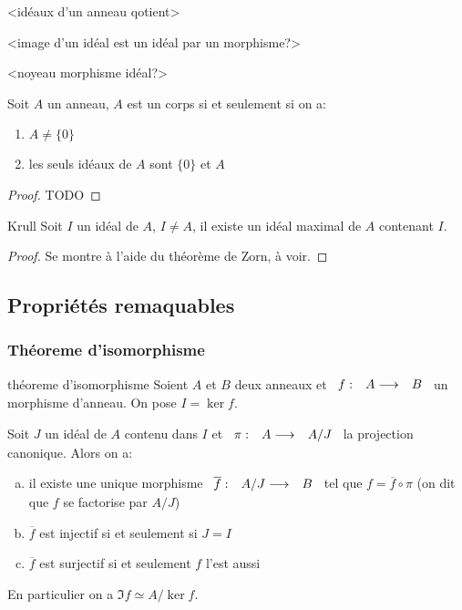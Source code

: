 <idéaux d'un anneau qotient>

<image d'un idéal est un idéal par un morphisme?>

<noyeau morphisme idéal?>

\begin{lemma}{}{}
    Soit $A$ un anneau, $A$ est un corps si et seulement si on a:
    \begin{enumerate}[(1)]
        \item $A \neq \{0\}$
        \item les seuls idéaux de $A$ sont $\{0\}$ et $A$
    \end{enumerate}
\end{lemma}

\begin{proof}
    TODO
\end{proof}

\begin{theorem}{Krull}{}
    Soit $I$ un idéal de $A$, $I \neq A$, il existe un idéal maximal de $A$ contenant $I$.
\end{theorem}

\begin{proof}
    Se montre à l'aide du théorème de Zorn, à voir.
\end{proof}

\subsection{Propriétés remaquables}

\subsubsection{Théoreme d'isomorphisme}

\begin{theorem}{théoreme d'isomorphisme}{}
    Soient $A$ et $B$ deux anneaux et $\begin{array}[t]{ccc}f : & A \longrightarrow & B\end{array}$ un morphisme d'anneau.
    On pose $I = \ker{f}$.

    Soit $J$ un idéal de $A$ contenu dans $I$ et $\begin{array}[t]{ccc}\pi : & A \longrightarrow & A/J\end{array}$ la projection canonique. Alors on a:
    \begin{enumerate}[(a)]
        \item il existe une unique morphisme $\begin{array}[t]{ccc}\overline{f} : & A/J \longrightarrow & B\end{array}$ tel que $f = \overline{f} \circ \pi$
                (on dit que $f$ se factorise par $A/J$)
        \item $\overline{f}$ est injectif si et seulement si $J = I$
        \item $\overline{f}$ est surjectif si et seulement $f$ l'est aussi
    \end{enumerate}

    En particulier on a $\Im{f} \simeq A/\ker{f}$.
\end{theorem}

